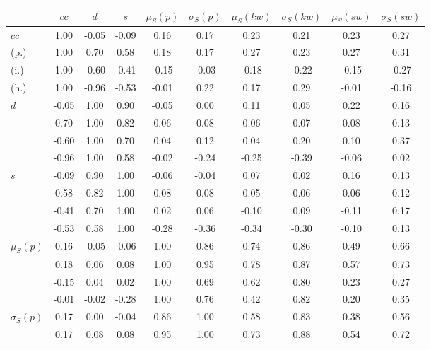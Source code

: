 \begin{table*}[h!]
\begin{center}
\begin{tabular}{| l | c | c | c | c | c | c | c | c | c |}\hline
 & $cc$ & $d$ & $s$ & $\mu_S(p)$ & $\sigma_S(p)$ & $\mu_S(kw)$ & $\sigma_S(kw)$ & $\mu_S(sw)$ & $\sigma_S(sw)$ \\\hline
$cc$ & 1.00  & -0.05  & -0.09  & 0.16  & 0.17  & 0.23  & 0.21  & 0.23  & 0.27 \\\hline
(p.) & 1.00  & 0.70  & 0.58  & 0.18  & 0.17  & 0.27  & 0.23  & 0.27  & 0.31 \\\hline
(i.) & 1.00  & -0.60  & -0.41  & -0.15  & -0.03  & -0.18  & -0.22  & -0.15  & -0.27 \\\hline
(h.) & 1.00  & -0.96  & -0.53  & -0.01  & 0.22  & 0.17  & 0.29  & -0.01  & -0.16 \\\hline
$d$ & -0.05  & 1.00  & 0.90  & -0.05  & 0.00  & 0.11  & 0.05  & 0.22  & 0.16 \\\hline
 & 0.70  & 1.00  & 0.82  & 0.06  & 0.08  & 0.06  & 0.07  & 0.08  & 0.13 \\\hline
 & -0.60  & 1.00  & 0.70  & 0.04  & 0.12  & 0.04  & 0.20  & 0.10  & 0.37 \\\hline
 & -0.96  & 1.00  & 0.58  & -0.02  & -0.24  & -0.25  & -0.39  & -0.06  & 0.02 \\\hline
$s$ & -0.09  & 0.90  & 1.00  & -0.06  & -0.04  & 0.07  & 0.02  & 0.16  & 0.13 \\\hline
 & 0.58  & 0.82  & 1.00  & 0.08  & 0.08  & 0.05  & 0.06  & 0.06  & 0.12 \\\hline
 & -0.41  & 0.70  & 1.00  & 0.02  & 0.06  & -0.10  & 0.09  & -0.11  & 0.17 \\\hline
 & -0.53  & 0.58  & 1.00  & -0.28  & -0.36  & -0.34  & -0.30  & -0.10  & 0.13 \\\hline
$\mu_S(p)$ & 0.16  & -0.05  & -0.06  & 1.00  & 0.86  & 0.74  & 0.86  & 0.49  & 0.66 \\\hline
 & 0.18  & 0.06  & 0.08  & 1.00  & 0.95  & 0.78  & 0.87  & 0.57  & 0.73 \\\hline
 & -0.15  & 0.04  & 0.02  & 1.00  & 0.69  & 0.62  & 0.80  & 0.23  & 0.27 \\\hline
 & -0.01  & -0.02  & -0.28  & 1.00  & 0.76  & 0.42  & 0.82  & 0.20  & 0.35 \\\hline
$\sigma_S(p)$ & 0.17  & 0.00  & -0.04  & 0.86  & 1.00  & 0.58  & 0.83  & 0.38  & 0.56 \\\hline
 & 0.17  & 0.08  & 0.08  & 0.95  & 1.00  & 0.73  & 0.88  & 0.54  & 0.72 \\\hline

\end{tabular}
\end{center}
\end{table*}
